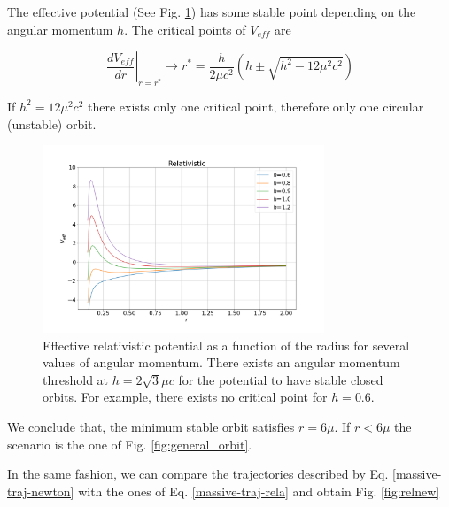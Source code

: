 \documentclass[letterpaper,11pt,onecolumn]{article}
\begin{document}
The effective potential (See Fig. \ref{fig:massive-eff-V}) has some stable point depending on the angular momentum $h$. The critical points of $V_{eff}$ are 

\begin{equation}
    \left. \frac{dV_{eff}}{dr} \right|_{r=r^*} \longrightarrow r^* = \frac{h}{2\mu c^2} \left( h \pm \sqrt{h^2 - 12 \mu^2 c^2} \right)
\end{equation}

If $h^2 = 12 \mu^2 c^2$ there exists only one critical point, therefore only one circular (unstable) orbit.

\begin{figure}[h!]
    \centering
    \includegraphics[width=0.75\textwidth]{Presentations/Images/2_veff_relat.png}
    \caption{Effective relativistic potential as a function of the radius for several values of angular momentum. There exists an angular momentum threshold at $h=2\sqrt{3} \mu c$ for the potential to have stable closed orbits. For example, there exists no critical point for $h=0.6$.}
    \label{fig:massive-eff-V}
\end{figure}
  

We conclude that, the minimum stable orbit satisfies $r=6\mu$. If $r < 6\mu$ the scenario is the one of Fig. \ref{fig:general_orbit}.

In the same fashion, we can compare the trajectories described by Eq. \ref{massive-traj-newton} with the ones of Eq. \ref{massive-traj-rela} and obtain Fig. \ref{fig:relnew}
\end{document}
